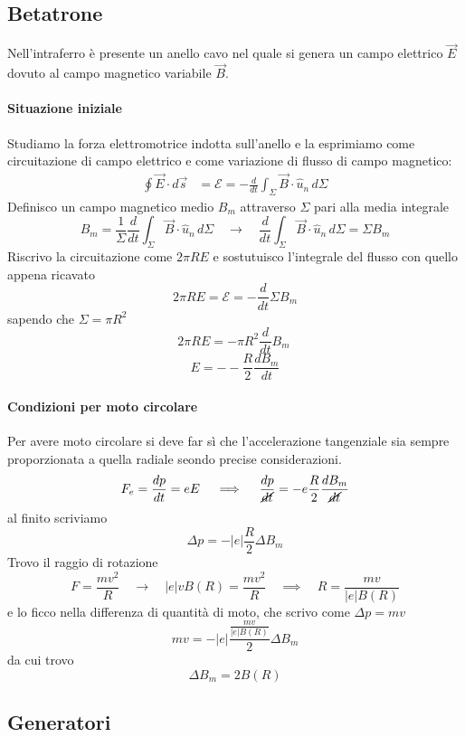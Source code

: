 \documentclass[x11names]{report}
\begin{document}
\subsection{Betatrone}
Nell'intraferro è presente un anello cavo nel quale si genera un campo elettrico \(\vec{E}\) dovuto al campo magnetico variabile \(\vec{B}\). 

\paragraph{Situazione iniziale}
Studiamo la forza elettromotrice indotta sull'anello e la esprimiamo come circuitazione di campo elettrico e come variazione di flusso di campo magnetico:
\begin{align*}
	\oint \vec{E}\cdot d\vec{s} &= \mathcal{E} = -\frac{d}{dt}\int_\Sigma \vec{B}\cdot \hat{u}_n \, d\Sigma 
\end{align*}
Definisco un campo magnetico medio \(B_m\) attraverso \(\Sigma\) pari alla media integrale
\[
B_m = \frac{1}{\Sigma}\frac{d}{dt}\int_\Sigma \vec{B}\cdot \hat{u}_n \, d\Sigma \quad \to \quad \frac{d}{dt}\int_\Sigma \vec{B}\cdot \hat{u}_n \, d\Sigma = \Sigma B_m
\]
Riscrivo la circuitazione come \(2\pi R E\) e sostutuisco l'integrale del flusso con quello appena ricavato
\[
2\pi R E = \mathcal{E} = -\frac{d}{dt}\Sigma B_m
\]
sapendo che \(\Sigma = \pi R^2\)
\[
2\pi R E = -\pi R^2\frac{d}{dt}B_m\ 
\]
\begin{equation}
	E = --\frac{R}{2}\frac{dB_m}{dt}
\end{equation}

\paragraph{Condizioni per moto circolare}
Per avere moto circolare si deve far sì che l'accelerazione tangenziale sia sempre proporzionata a quella radiale seondo precise considerazioni.
\[
F_e = \frac{dp}{dt} = eE \quad \implies \quad \frac{dp}{\cancel{dt}} = -e\frac{R}{2}\frac{dB_m}{\cancel{dt}}
\]
al finito scriviamo
\[
\Delta p = -|e|\frac{R}{2}\Delta B_m
\]
Trovo il raggio di rotazione
\[
F = \frac{mv^2}{R} \quad \to \quad |e| v B(R) = \frac{mv^2}{R} \quad \implies \quad R = \frac{mv}{|e|B(R)}
\]
e lo ficco nella differenza di quantità di moto, che scrivo come \(\Delta p = mv\)
\[
mv = -|e|\frac{\frac{mv}{|e|B(R)}}{2}\Delta B_m
\]
da cui trovo
\begin{equation}
	\Delta B_m = 2B(R)
\end{equation}
\subsection{Generatori}
\end{document}
